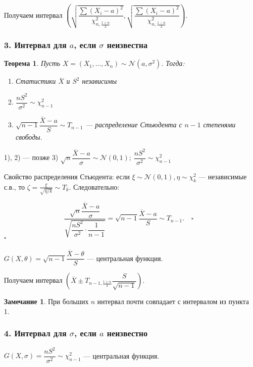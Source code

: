 \documentclass[12pt]{report}
\renewenvironment{proof}{{\bfseries Доказательство:}}{$\square$\\\\}
\newtheorem{theorem}{Теорема}
\theoremstyle{definition}
\newtheorem{remark}{Замечание}
\begin{document}
Получаем интервал $\left(\sqrt{\dfrac{\sum(X_i - a)^2}{\chi^2_{n, \frac{1+\alpha}{2}}}}, \sqrt{\dfrac{\sum(X_i - a)^2}{\chi^2_{n, \frac{1-\alpha}{2}}}}\right)$.

\subsubsection{3. Интервал для $a$, если $\sigma$ неизвестна}
\begin{theorem}
	Пусть $X=(X_1, \dots, X_n) \sim \mathcal{N}(a, \sigma^2)$. Тогда:
	\begin{enumerate}
		\item Статистики $\overline{X}$ и $S^2$ независимы
		\item $\dfrac{nS^2}{\sigma^2} \sim \chi_{n-1}^2$
		\item $\sqrt{n-1} \dfrac{\overline{X} - a}{S} \sim T_{n-1}$ — \emph{распределение Стьюдента с $n-1$ степенями свободы}.
	\end{enumerate}
\end{theorem}
\begin{proof}
	1), 2) — позже  
3) $\sqrt{n} \dfrac{\overline{X} - a}{\sigma} \sim \mathcal{N}(0, 1); \  \dfrac{nS^2}{\sigma^2} \sim \chi^2_{n-1}$

Свойство распределения Стьюдента: если $\xi \sim \mathcal{N}(0, 1), \eta \sim \chi^2_k$ — независимые с.в., то $\zeta = \frac{\xi}{\sqrt{\eta / k}} \sim T_k$. Следовательно:

$$ \dfrac{\sqrt{n}\dfrac{\overline{X} - a}{\sigma}}{\sqrt{\dfrac{nS^2}{\sigma^2} \cdot \dfrac{1}{n-1}}} = \sqrt{n-1}\dfrac{\overline{X} - a}{S} \sim T_{n-1}. \quad \square $$
\end{proof} 
$G(X, \theta) = \sqrt{n-1}\dfrac{\overline{X} - \theta}{S}$ — центральная функция.

Получаем интервал $\left(\overline{X} \pm T_{n-1, \frac{1 + \alpha}{2}} \dfrac{S}{\sqrt{n-1}}\right)$. 

\begin{remark}
	При больших $n$ интервал почти совпадает с интервалом из пункта 1.
\end{remark}

\subsubsection{4. Интервал для $\sigma$, если $a$ неизвестно}

$G(X, \sigma) = \dfrac{nS^2}{\sigma^2} \sim \chi^2_{n-1}$ — центральная функция.
\end{document}
